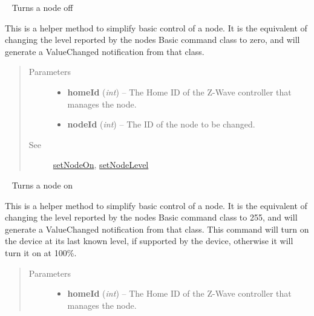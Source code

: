 \documentclass[letterpaper,10pt,english]{sphinxmanual}
\begin{document}
\begin{fulllineitems}
\begin{fulllineitems}
\begin{quote}
\begin{description}
\end{description}\end{quote}

\end{fulllineitems}


\begin{fulllineitems}
\label{libopenzwave:libopenzwave.PyManager.setNodeOff}~\label{libopenzwave:setnodeoff}
Turns a node off

This is a helper method to simplify basic control of a node.  It is the
equivalent of changing the level reported by the nodes Basic command class to
zero, and will generate a ValueChanged notification from that class.
\begin{quote}\begin{description}
\item[{Parameters}] \leavevmode\begin{itemize}
\item {} 
\textbf{homeId} (\emph{int}) -- The Home ID of the Z-Wave controller that manages the node.

\item {} 
\textbf{nodeId} (\emph{int}) -- The ID of the node to be changed.

\end{itemize}

\item[{See}] \leavevmode
{\hyperref[libopenzwave:setnodeon]{setNodeOn}}, {\hyperref[libopenzwave:setnodelevel]{setNodeLevel}}

\end{description}\end{quote}

\end{fulllineitems}


\begin{fulllineitems}
\label{libopenzwave:libopenzwave.PyManager.setNodeOn}~\label{libopenzwave:setnodeon}
Turns a node on

This is a helper method to simplify basic control of a node.  It is the
equivalent of changing the level reported by the nodes Basic command class to
255, and will generate a ValueChanged notification from that class.  This
command will turn on the device at its last known level, if supported by the
device, otherwise it will turn it on at 100\%.
\begin{quote}\begin{description}
\item[{Parameters}] \leavevmode\begin{itemize}
\item {} 
\textbf{homeId} (\emph{int}) -- The Home ID of the Z-Wave controller that manages the node.


\end{itemize}
\end{description}
\end{quote}
\end{fulllineitems}
\end{fulllineitems}
\end{document}
